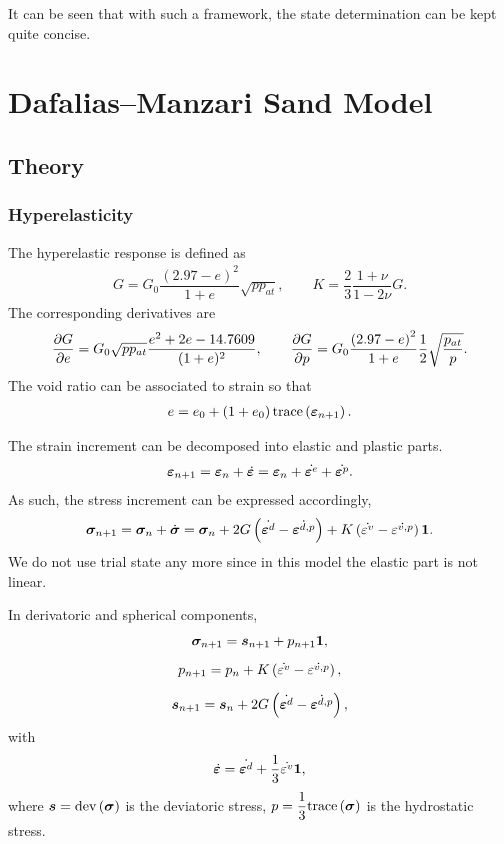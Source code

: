 It can be seen that with such a framework, the state determination can be kept quite concise.
\section{Dafalias--Manzari Sand Model}
\subsection{Theory}
\subsubsection{Hyperelasticity}
The hyperelastic response is defined as
\begin{gather}
G=G_0\dfrac{\left(2.97-e\right)^2}{1+e}\sqrt{pp_{at}},\qquad
K=\dfrac{2}{3}\dfrac{1+\nu}{1-2\nu}G.
\end{gather}
The corresponding derivatives are
\begin{gather}
\dfrac{\partial{G}}{\partial{e}}=G_0\sqrt{pp_{at}}\dfrac{e^2+2e-14.7609}{(1+e)^2},\qquad
\dfrac{\partial{G}}{\partial{p}}=G_0\dfrac{\left(2.97-e\right)^2}{1+e}\dfrac{1}{2}\sqrt{\dfrac{p_{at}}{p}}.
\end{gather}
The void ratio can be associated to strain so that
\begin{gather}
e=e_0+\left(1+e_0\right)\text{trace}\left(\bm{\varepsilon}_{n+1}\right).
\end{gather}

The strain increment can be decomposed into elastic and plastic parts.
\begin{gather}
\bm{\varepsilon}_{n+1}=\bm{\varepsilon}_n+\dot{\bm{\varepsilon}}=\bm{\varepsilon}_n+\dot{\bm{\varepsilon}^{e}}+\dot{\bm{\varepsilon}^{p}}.
\end{gather}
As such, the stress increment can be expressed accordingly,
\begin{gather}
\bm{\sigma}_{n+1}=\bm{\sigma}_n+\dot{\bm{\sigma}}=\bm{\sigma}_n+2G\left(\dot{\bm{\varepsilon}^d}-\dot{\bm{\varepsilon}^{d,p}}\right)+K\left(\dot{\varepsilon^v}-\dot{\varepsilon^{v,p}}\right)\bm{1}.
\end{gather}
We do not use trial state any more since in this model the elastic part is not linear.

In derivatoric and spherical components,
\begin{gather}
\bm{\sigma}_{n+1}=\bm{s}_{n+1}+p_{n+1}\bm{1},\\[2mm]
p_{n+1}=p_n+K\left(\dot{\varepsilon^v}-\dot{\varepsilon^{v,p}}\right),\\[2mm]
\bm{s}_{n+1}=\bm{s}_n+2G\left(\dot{\bm{\varepsilon}^d}-\dot{\bm{\varepsilon}^{d,p}}\right),
\end{gather}
with
\begin{gather}
\dot{\bm{\varepsilon}}=\dot{\bm{\varepsilon}^d}+\dfrac{1}{3}\dot{\varepsilon^v}\bm{1},
\end{gather}
where $\bm{s}=\text{dev}\left(\bm{\sigma}\right)$ is the deviatoric stress, $p=\dfrac{1}{3}\text{trace}\left(\bm{\sigma}\right)$ is the hydrostatic stress.
